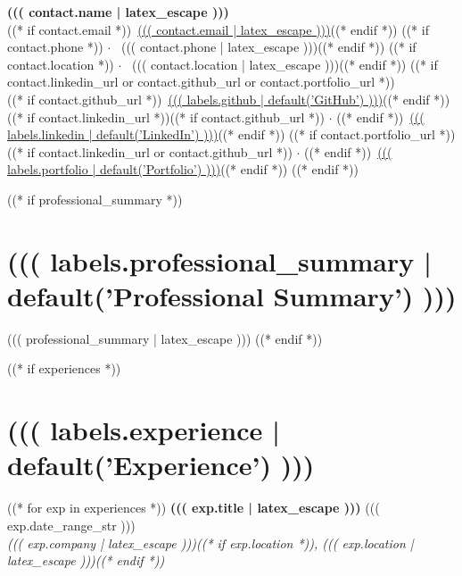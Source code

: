 \documentclass[11pt,letterpaper]{article}
\begin{document}
\begin{center}
    {\fontsize{22}{26}\bfseries\color{secondary} ((( contact.name | latex_escape )))}\\[6pt]
    {\color{accent}
        ((* if contact.email *)){\color{gray}\faEnvelope}\ \href{mailto:((( contact.email | latex_escape )))}{((( contact.email | latex_escape )))}((* endif *))%
        ((* if contact.phone *)) \enspace $\cdot$ \enspace {\color{gray}\faPhone}\ ((( contact.phone | latex_escape )))((* endif *))%
        ((* if contact.location *)) \enspace $\cdot$ \enspace {\color{gray}\faMapMarker*}\ ((( contact.location | latex_escape )))((* endif *))
    }
    ((* if contact.linkedin_url or contact.github_url or contact.portfolio_url *))
    \\[3pt]
    {\color{accent}
        ((* if contact.github_url *)){\color{gray}\faGithub}\ \href{((( contact.github_url | string )))}{((( labels.github | default('GitHub') )))}((* endif *))%
        ((* if contact.linkedin_url *))((* if contact.github_url *)) \enspace $\cdot$ \enspace ((* endif *)){\color{gray}\faLinkedin}\ \href{((( contact.linkedin_url | string )))}{((( labels.linkedin | default('LinkedIn') )))}((* endif *))%
        ((* if contact.portfolio_url *))((* if contact.linkedin_url or contact.github_url *)) \enspace $\cdot$ \enspace ((* endif *)){\color{gray}\faGlobe}\ \href{((( contact.portfolio_url | string )))}{((( labels.portfolio | default('Portfolio') )))}((* endif *))
    }
    ((* endif *))
\end{center}
\vspace{2pt}

((* if professional_summary *))
\section{((( labels.professional_summary | default('Professional Summary') )))}
((( professional_summary | latex_escape )))
((* endif *))

((* if experiences *))
\section{((( labels.experience | default('Experience') )))}

((* for exp in experiences *))
\noindent
\textbf{\color{secondary}((( exp.title | latex_escape )))} \hfill {\color{accent}((( exp.date_range_str )))}\\
\textit{((( exp.company | latex_escape )))((* if exp.location *)), ((( exp.location | latex_escape )))((* endif *))}
\vspace{2pt}
\end{document}
